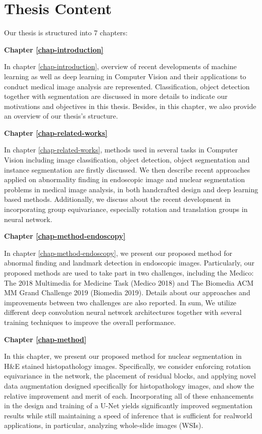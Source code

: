 \section{Thesis Content}
Our thesis is structured into 7 chapters:

\textbf{Chapter \ref{chap-introduction}} 

In chapter \ref{chap-introduction}, overview of recent developments of machine learning as well as deep learning in Computer Vision and their applications to conduct medical image analysis are represented. Classification, object detection together with segmentation are discussed in more details to indicate our motivations and objectives in this thesis. Besides, in this chapter, we also provide an overview of our thesis's structure.

\textbf{Chapter \ref{chap-related-works}}

In chapter \ref{chap-related-works}, methods used in several tasks in Computer Vision including image classification, object detection, object segmentation and instance segmentation are firstly discussed. We then describe recent approaches applied on abnormality finding in endoscopic image and nuclear segmentation problems in medical image analysis, in both handcrafted design and deep learning based methods. Additionally, we discuss about the recent development in incorporating group equivariance, especially rotation and translation groups in neural network.

\textbf{Chapter \ref{chap-method-endoscopy}}

In chapter \ref{chap-method-endoscopy}, we present our proposed method for abnormal finding and landmark detection in endoscopic images. Particularly, our proposed methods are used to take part in two challenges, including the Medico: The 2018 Multimedia for Medicine Task (Medico 2018) and The Biomedia ACM MM Grand Challenge 2019 (Biomedia 2019). Details about our approaches and improvements between two challenges are also reported. In sum, We utilize different  deep convolution neural network architectures together with several training techniques to improve the overall performance.


\textbf{Chapter \ref{chap-method}}

In this chapter, we present our proposed method for nuclear segmentation in H\&E stained histopathology images. Specifically, we consider enforcing rotation equivariance in the network, the placement of residual blocks, and applying novel data augmentation designed specifically for histopathology images, and show the relative improvement and merit of each. Incorporating all of these enhancements in the design and training of a U-Net yields significantly improved segmentation results while still maintaining a speed of inference that is sufficient for realworld applications, in particular, analyzing whole-slide images (WSIs).

